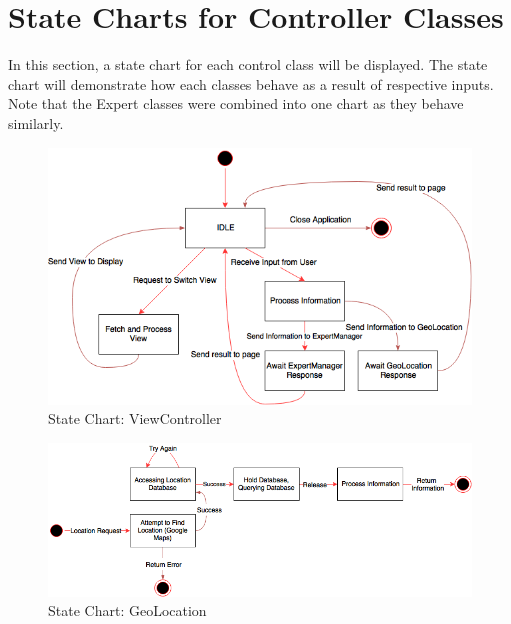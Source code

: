 \documentclass[]{article}
\begin{document}
\section{State Charts for Controller Classes}
\label{sec:state_charts_for_controller_classes}
In this section, a state chart for each control class will be displayed. The state chart will demonstrate how each classes behave as a result of respective inputs. Note that the Expert classes were combined into one chart as they behave similarly.
\begin{figure}[H]
	\includegraphics[width=\textwidth]{images/ViewController.png}
	\caption{State Chart: ViewController}
\end{figure}
\begin{figure}[H]
	\includegraphics[width=\textwidth]{images/GeoLocation.png}
	\caption{State Chart: GeoLocation}
\end{figure}
\end{document}
